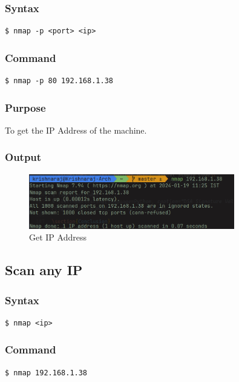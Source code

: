 \documentclass[11pt]{article}
\begin{document}
\subsubsection{Syntax}
\begin{verbatim}
$ nmap -p <port> <ip>
\end{verbatim}

\subsubsection*{Command}
\begin{verbatim}
$ nmap -p 80 192.168.1.38
\end{verbatim}

\subsubsection*{Purpose}
To get the IP Address of the machine.

\subsubsection*{Output}
\begin{figure}[H]
    \centering
    \includegraphics[width=0.8\textwidth]{nmap ip.png}
    \caption{Get IP Address}
    \label{fig:1}
\end{figure}

\subsection{Scan any IP}

\subsubsection{Syntax}
\begin{verbatim}
$ nmap <ip>
\end{verbatim}

\subsubsection*{Command}
\begin{verbatim}
$ nmap 192.168.1.38
\end{verbatim}
\end{document}
